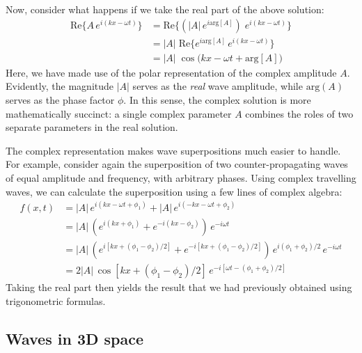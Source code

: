 \documentclass[10pt,a4paper]{article}
\begin{document}
Now, consider what happens if we take the real part of the above
solution:
\begin{align}
  \mathrm{Re}\Big\{A \, e^{i(kx - \omega t)}\Big\} &= \mathrm{Re}\Big\{ \left(\big|A\big|\, e^{i\mathrm{arg}[A]}\right) \; e^{i(kx - \omega t)}\Big\} \\ &= \big|A\big|\; \mathrm{Re}\Big\{ e^{i\mathrm{arg}[A]} \, e^{i(kx - \omega t)}\Big\} \\ &= \big|A\big|\; \cos\big(kx - \omega t + \mathrm{arg}[A]\big)
\end{align}
Here, we have made use of the polar representation of the complex
amplitude $A$. Evidently, the magnitude $|A|$ serves as the
\emph{real} wave amplitude, while $\mathrm{arg}(A)$ serves as the
phase factor $\phi$. In this sense, the complex solution is more
mathematically succinct: a single complex parameter $A$ combines the
roles of two separate parameters in the real solution.

The complex representation makes wave superpositions much easier to
handle. For example, consider again the superposition of two
counter-propagating waves of equal amplitude and frequency, with
arbitrary phases. Using complex travelling waves, we can calculate the
superposition using a few lines of complex algebra:
\begin{align}
  f(x,t) &= \displaystyle \big|A\big| \, e^{i(kx - \omega t + \phi_1)} + \big|A\big| \, e^{i(-kx - \omega t + \phi_2)} \\ &= \displaystyle \big|A\big|\, \left(e^{i(kx + \phi_1)} + e^{-i(kx - \phi_2)}\right)\, e^{-i\omega t} \\ &= \displaystyle \big|A\big|\, \left(e^{i[kx + (\phi_1-\phi_2)/2]} + e^{-i[kx + (\phi_1 - \phi_2)/2]}\right)\, e^{i(\phi_1 + \phi_2)/2} \,e^{-i\omega t} \\ &= \displaystyle 2\big|A\big|\, \cos\left[kx + (\phi_1-\phi_2)/2\right] \,e^{-i[\omega t -(\phi_1+\phi_2)/2]}
\end{align}
Taking the real part then yields the result that we had previously
obtained using trigonometric formulas.

\subsection{Waves in 3D space}
\label{waves-in-3d-space}
\end{document}
